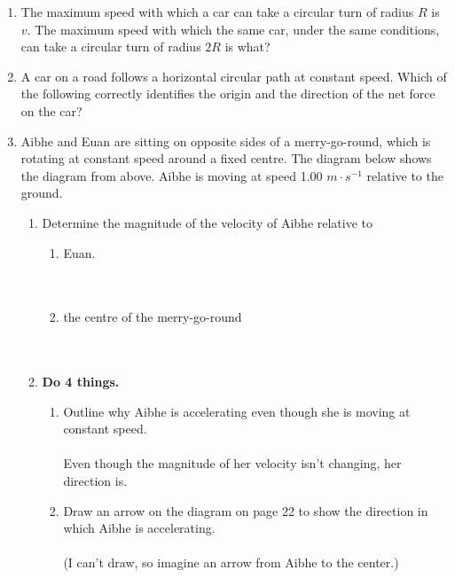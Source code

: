 \documentclass[a4paper]{report}
\begin{document}
\begin{enumerate}
        \item The maximum speed with which a car can take a circular turn of radius $R$ is $v$. The maximum speed with which the same car, under the same conditions, can take a circular turn of radius $2R$ is what? 
        \item A car on a road follows a horizontal circular path at constant speed. Which of the following correctly identifies the origin and the direction of the net force on the car? 
        \item Aibhe and Euan are sitting on opposite sides of a merry-go-round, which is rotating at constant speed around a fixed centre. The diagram below shows the diagram from above. Aibhe is moving at speed 1.00 $m \cdot s^{-1}$ relative to the ground. 
            \begin{enumerate}
                \item Determine the magnitude of the velocity of Aibhe relative to
                \begin{enumerate}
                \item Euan. \\ \\
                     \\
                \item the centre of the merry-go-round \\ \\
                     \\
                \end{enumerate}
                \item \textbf{Do 4 things.}
                    \begin{enumerate}
                        \item Outline why Aibhe is accelerating even though she is moving at constant speed. \\ \\ 
                        Even though the magnitude of her velocity isn't changing, her direction is. \\
                    \item Draw an arrow on the diagram on page 22 to show the direction in which Aibhe is accelerating. \\ \\ 
                        (I can't draw, so imagine an arrow from Aibhe to the center.) \\ 

\end{enumerate}
\end{enumerate}
\end{enumerate}
\end{document}
